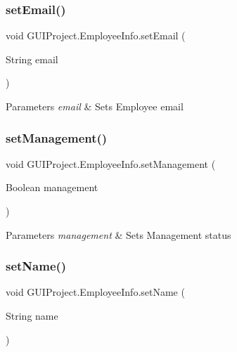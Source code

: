 \subsubsection{\texorpdfstring{setEmail()}{setEmail()}}
{\footnotesize\ttfamily void G\+U\+I\+Project.\+Employee\+Info.\+set\+Email (\begin{DoxyParamCaption}\item[{String}]{email }\end{DoxyParamCaption})}


\begin{DoxyParams}{Parameters}
{\em email} & Sets Employee email \\
\hline
\end{DoxyParams}
\mbox{\label{class_g_u_i_project_1_1_employee_info_afdbc7d5956a0e2befab118ad75c7865a}} 
\subsubsection{\texorpdfstring{setManagement()}{setManagement()}}
{\footnotesize\ttfamily void G\+U\+I\+Project.\+Employee\+Info.\+set\+Management (\begin{DoxyParamCaption}\item[{Boolean}]{management }\end{DoxyParamCaption})}


\begin{DoxyParams}{Parameters}
{\em management} & Sets Management status \\
\hline
\end{DoxyParams}
\mbox{\label{class_g_u_i_project_1_1_employee_info_ae75f9f9b22c047d3259a8ad1fd08682e}} 
\subsubsection{\texorpdfstring{setName()}{setName()}}
{\footnotesize\ttfamily void G\+U\+I\+Project.\+Employee\+Info.\+set\+Name (\begin{DoxyParamCaption}\item[{String}]{name }\end{DoxyParamCaption})}



